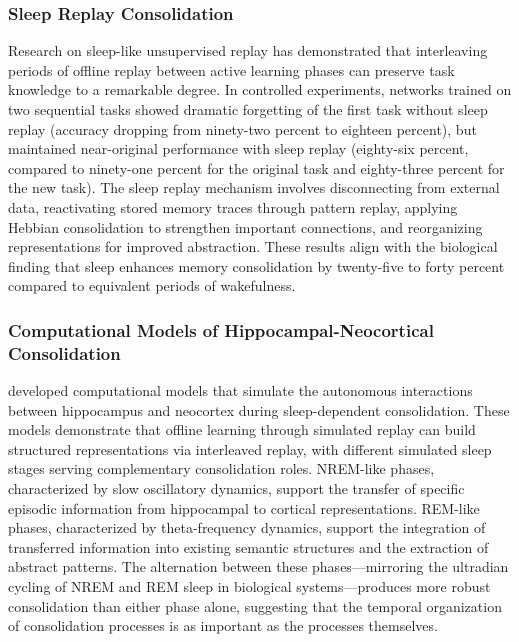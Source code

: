 \subsubsection{Sleep Replay Consolidation}

Research on sleep-like unsupervised replay has demonstrated that interleaving periods of offline replay between active learning phases can preserve task knowledge to a remarkable degree. In controlled experiments, networks trained on two sequential tasks showed dramatic forgetting of the first task without sleep replay (accuracy dropping from ninety-two percent to eighteen percent), but maintained near-original performance with sleep replay (eighty-six percent, compared to ninety-one percent for the original task and eighty-three percent for the new task). The sleep replay mechanism involves disconnecting from external data, reactivating stored memory traces through pattern replay, applying Hebbian consolidation to strengthen important connections, and reorganizing representations for improved abstraction. These results align with the biological finding that sleep enhances memory consolidation by twenty-five to forty percent compared to equivalent periods of wakefulness.

\subsubsection{Computational Models of Hippocampal-Neocortical Consolidation}

\citet{gonzalez2022model} developed computational models that simulate the autonomous interactions between hippocampus and neocortex during sleep-dependent consolidation. These models demonstrate that offline learning through simulated replay can build structured representations via interleaved replay, with different simulated sleep stages serving complementary consolidation roles. NREM-like phases, characterized by slow oscillatory dynamics, support the transfer of specific episodic information from hippocampal to cortical representations. REM-like phases, characterized by theta-frequency dynamics, support the integration of transferred information into existing semantic structures and the extraction of abstract patterns. The alternation between these phases---mirroring the ultradian cycling of NREM and REM sleep in biological systems---produces more robust consolidation than either phase alone, suggesting that the temporal organization of consolidation processes is as important as the processes themselves.

